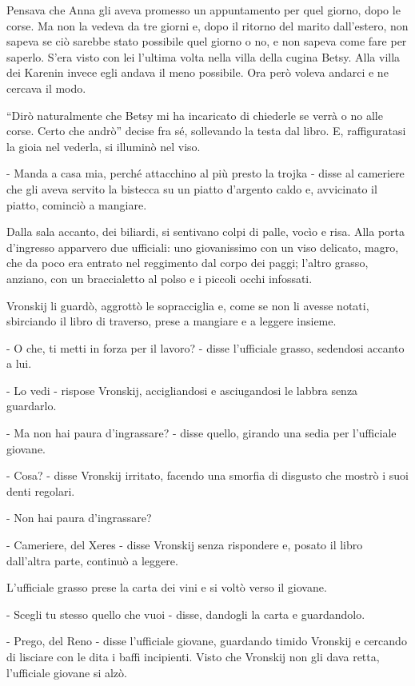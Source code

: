 Pensava che Anna gli aveva promesso un appuntamento per quel giorno, dopo le corse. Ma non la vedeva da tre giorni e, dopo il ritorno del marito dall'estero, non sapeva se ciò sarebbe stato possibile quel giorno o no, e non sapeva come fare per saperlo. S'era visto con lei l'ultima volta nella villa della cugina Betsy. Alla villa dei Karenin invece egli andava il meno possibile. Ora però voleva andarci e ne cercava il modo. 

``Dirò naturalmente che Betsy mi ha incaricato di chiederle se verrà o no alle corse. Certo che andrò'' decise fra sé, sollevando la testa dal libro. E, raffiguratasi la gioia nel vederla, si illuminò nel viso. 

- Manda a casa mia, perché attacchino al più presto la trojka - disse al cameriere che gli aveva servito la bistecca su un piatto d'argento caldo e, avvicinato il piatto, cominciò a mangiare. 

Dalla sala accanto, dei biliardi, si sentivano colpi di palle, vocìo e risa. Alla porta d'ingresso apparvero due ufficiali: uno giovanissimo con un viso delicato, magro, che da poco era entrato nel reggimento dal corpo dei paggi; l'altro grasso, anziano, con un braccialetto al polso e i piccoli occhi infossati. 

Vronskij li guardò, aggrottò le sopracciglia e, come se non li avesse notati, sbirciando il libro di traverso, prese a mangiare e a leggere insieme. 

- O che, ti metti in forza per il lavoro? - disse l'ufficiale grasso, sedendosi accanto a lui. 

- Lo vedi - rispose Vronskij, accigliandosi e asciugandosi le labbra senza guardarlo. 

- Ma non hai paura d'ingrassare? - disse quello, girando una sedia per l'ufficiale giovane. 

- Cosa? - disse Vronskij irritato, facendo una smorfia di disgusto che mostrò i suoi denti regolari. 

- Non hai paura d'ingrassare? 

- Cameriere, del Xeres - disse Vronskij senza rispondere e, posato il libro dall'altra parte, continuò a leggere. 

L'ufficiale grasso prese la carta dei vini e si voltò verso il giovane. 

- Scegli tu stesso quello che vuoi - disse, dandogli la carta e guardandolo. 

- Prego, del Reno - disse l'ufficiale giovane, guardando timido Vronskij e cercando di lisciare con le dita i baffi incipienti. Visto che Vronskij non gli dava retta, l'ufficiale giovane si alzò. 

